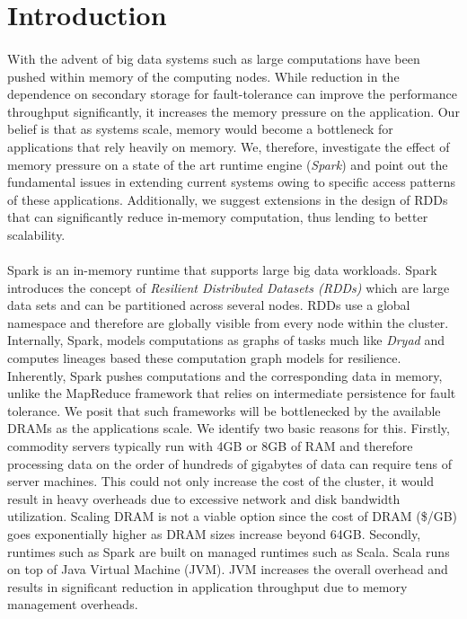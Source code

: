\section{Introduction} 
\label{sec:intro}
\paragraph{}
With the advent of big data systems such as \cite{zaharia2012resilient, engle2012shark, agarwal2013blinkdb} large computations have been pushed within memory of the computing nodes. While reduction in the dependence on secondary storage for fault-tolerance can improve the performance throughput significantly, it increases the memory pressure on the application. Our belief is that as systems scale, memory would become a bottleneck for applications that rely heavily on memory. We, therefore, investigate the effect of memory pressure on a state of the art runtime engine (\textit{Spark}) and point out the fundamental issues in extending current systems owing to specific access patterns of these applications. Additionally, we suggest extensions in the design of RDDs that can significantly reduce in-memory computation, thus lending to better scalability. 
\paragraph{}
Spark is an in-memory runtime that supports large big data workloads. Spark introduces the concept of \textit{Resilient Distributed Datasets (RDDs)} which are large data sets and can be partitioned across several nodes. RDDs use a global namespace and therefore are globally visible from every node within the cluster. Internally, Spark, models computations as graphs of tasks much like \textit{Dryad} \cite{isard2007dryad} and computes lineages based these computation graph models for resilience. Inherently, Spark pushes computations and the corresponding data in memory, unlike the MapReduce \cite{dean2008mapreduce} framework that relies on intermediate persistence for fault tolerance. We posit that such frameworks will be bottlenecked by the available DRAMs as the applications scale. We identify two basic reasons for this. Firstly, commodity servers typically run with 4GB or 8GB of RAM and therefore processing data on the order of hundreds of gigabytes of data can require tens of server machines. This could not only increase the cost of the cluster, it would result in heavy overheads due to excessive network and disk bandwidth utilization. Scaling DRAM is not a viable option since the cost of DRAM (\$/GB) goes exponentially higher as DRAM sizes increase beyond 64GB. \cite{badam2011ssdalloc} Secondly, runtimes such as Spark are built on managed runtimes such as Scala. Scala runs on top of Java Virtual Machine (JVM). JVM increases the overall overhead and results in significant reduction in application throughput due to memory management overheads. \cite{yang2006cramm}
